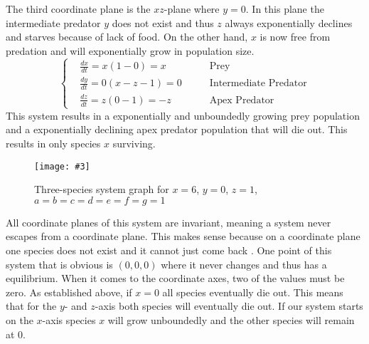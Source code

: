 \documentclass[12pt,a4paper,reqno]{amsart}
\newcommand{\makefig}[4]{
\begin{figure}[#1]
    \captionsetup{justification=centering}
    \texttt{[image: \#3]}
    \caption{#4}
    \label{fig:#3}
\end{figure}
}
\begin{document}
The third coordinate plane is the $xz$-plane where $y=0$. In this plane the
intermediate predator $y$ does not exist and thus $z$ always exponentially
declines and starves because of lack of food. On the other hand, $x$ is now
free from predation and will exponentially grow in population size. 
\begin{equation}\nonumber
    \left\{\begin{aligned}
        &\frac{dx}{dt} = x(1 - 0) = x              &\text{Prey}\\
        &\frac{dy}{dt} = 0(x - z - 1)=0 \qquad &\text{Intermediate Predator}\\
        &\frac{dz}{dt} = z(0 - 1) = -z             &\text{Apex Predator}
    \end{aligned}\right.
\end{equation}
This system results in a exponentially and unboundedly growing prey population
and a exponentially declining apex predator population that will die out. This
results in only species $x$ surviving.
\makefig{h}{\textwidth}{3s_y_zero_graph}{Three-species system graph for
$x=6$, $y=0$, $z=1$, $a=b=c=d=e=f=g=1$}

\newpage
All coordinate planes of this system are invariant, meaning a system never
escapes from a coordinate plane. This makes sense because on a coordinate plane
one species does not exist and it cannot just come back \cite{chauvet}. One
point of this system that is obvious is $(0,0,0)$ where it never changes and
thus has a equilibrium. When it comes to the coordinate axes, two of the values
must be zero. As established above, if $x=0$ all species eventually die out.
This means that for the $y$- and $z$-axis both species will eventually die out.
If our system starts on the $x$-axis species $x$ will grow unboundedly and the
other species will remain at 0.
\end{document}

